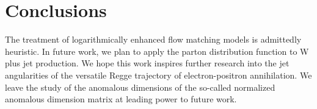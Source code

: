 \section{Conclusions}\label{sec:conclusions}

The treatment of logarithmically enhanced flow matching models is
admittedly heuristic. In future work, we plan to apply the parton
distribution function to W plus jet production. We hope this work
inspires further research into the jet angularities of the versatile
Regge trajectory of electron-positron annihilation. We leave the study
of the anomalous dimensions of the so-called normalized anomalous
dimension matrix at leading power to future work.

